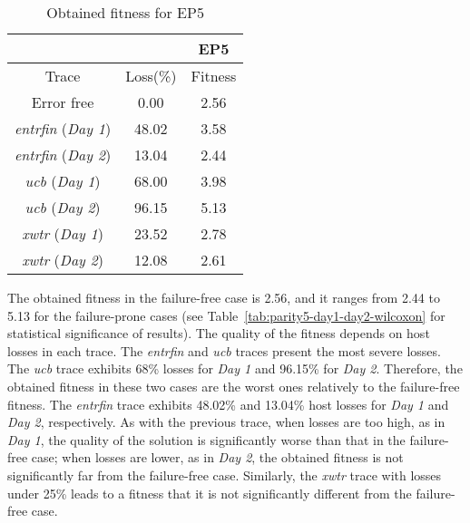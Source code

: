 \documentclass[graybox]{sty/svmult}
\begin{document}
\begin{table}[h]
    \caption{Obtained fitness for EP5}
\begin{center}
    \begin{tabular}{|c|c|c|}
        \cline{3-3}
        \multicolumn{2}{c|}{} & EP5 \\
        \hline Trace & Loss(\%) & Fitness \\             
        \hline Error free & 0.00 & 2.56  \\            
        \hline \emph{entrfin} (\emph{\emph{Day 1}}) & 48.02 & 3.58 \\
        \hline \emph{entrfin} (\emph{Day 2}) & 13.04 & 2.44 \\
        \hline \emph{ucb} (\emph{\emph{Day 1}}) & 68.00 & 3.98 \\
        \hline \emph{ucb} (\emph{Day 2}) & 96.15 & 5.13 \\
        \hline \emph{xwtr} (\emph{\emph{Day 1}}) & 23.52 & 2.78 \\           
        \hline \emph{xwtr} (\emph{Day 2}) & 12.08 & 2.61 \\           
        \hline     
\end{tabular}     
\end{center}
\label{tab:fitness}
\end{table}

The obtained fitness in the failure-free case is 2.56, and
it ranges from 2.44 to 5.13 for the failure-prone cases (see
Table~\ref{tab:parity5-day1-day2-wilcoxon} for statistical significance of
results).  The quality of the fitness depends on host losses in each
trace. The \emph{entrfin} and \emph{ucb} traces present the most severe
losses. The \emph{ucb}
trace exhibits 68\% losses for \emph{Day 1} and 96.15\% for \emph{Day
2}. Therefore, the obtained fitness in these two cases are the worst
ones relatively to the failure-free fitness.  The \emph{entrfin} trace
exhibits 48.02\% and 13.04\% host losses for \emph{Day 1} and \emph{Day 2},
respectively. As with the previous trace, when losses are too high, as
in \emph{Day 1}, the quality of the solution is significantly worse than
that in the failure-free case; when losses are lower, as in \emph{Day 2},
the obtained fitness is not significantly far from the failure-free case.
Similarly, the \emph{xwtr} trace with losses under 25\% leads to a
fitness that it is not significantly different from the failure-free case.
\end{document}
